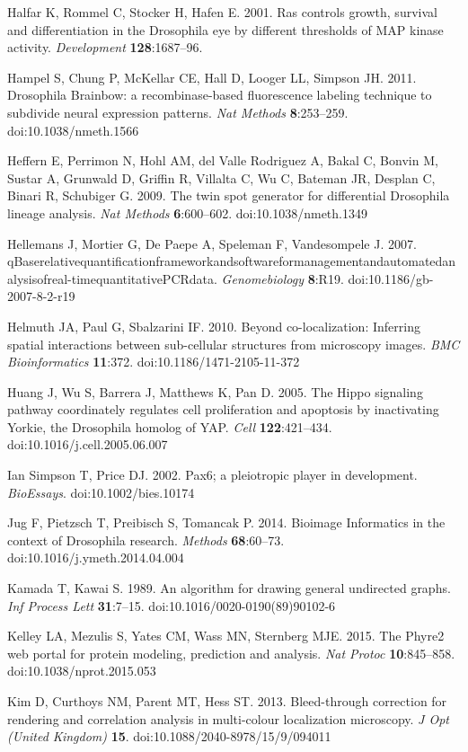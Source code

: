 Halfar K, Rommel C, Stocker H, Hafen E. 2001. Ras controls growth, survival and differentiation in the Drosophila eye by different thresholds of MAP kinase activity. \emph{Development} \textbf{128}:1687--96.

Hampel S, Chung P, McKellar CE, Hall D, Looger LL, Simpson JH. 2011. Drosophila Brainbow: a recombinase-based fluorescence labeling technique to subdivide neural expression patterns. \emph{Nat Methods} \textbf{8}:253--259. doi:10.1038/nmeth.1566

Heffern E, Perrimon N, Hohl AM, del Valle Rodriguez A, Bakal C, Bonvin M, Sustar A, Grunwald D, Griffin R, Villalta C, Wu C, Bateman JR, Desplan C, Binari R, Schubiger G. 2009. The twin spot generator for differential Drosophila lineage analysis. \emph{Nat Methods} \textbf{6}:600--602. doi:10.1038/nmeth.1349

Hellemans J, Mortier G, De Paepe A, Speleman F, Vandesompele J. 2007. qBaserelativequantificationframeworkandsoftwareformanagementandautomatedanalysisofreal-timequantitativePCRdata. \emph{Genomebiology} \textbf{8}:R19. doi:10.1186/gb-2007-8-2-r19

Helmuth JA, Paul G, Sbalzarini IF. 2010. Beyond co-localization: Inferring spatial interactions between sub-cellular structures from microscopy images. \emph{BMC Bioinformatics} \textbf{11}:372. doi:10.1186/1471-2105-11-372

Huang J, Wu S, Barrera J, Matthews K, Pan D. 2005. The Hippo signaling pathway coordinately regulates cell proliferation and apoptosis by inactivating Yorkie, the Drosophila homolog of YAP. \emph{Cell} \textbf{122}:421--434. doi:10.1016/j.cell.2005.06.007

Ian Simpson T, Price DJ. 2002. Pax6; a pleiotropic player in development. \emph{BioEssays}. doi:10.1002/bies.10174

Jug F, Pietzsch T, Preibisch S, Tomancak P. 2014. Bioimage Informatics in the context of Drosophila research. \emph{Methods} \textbf{68}:60--73. doi:10.1016/j.ymeth.2014.04.004

Kamada T, Kawai S. 1989. An algorithm for drawing general undirected graphs. \emph{Inf Process Lett} \textbf{31}:7--15. doi:10.1016/0020-0190(89)90102-6

Kelley LA, Mezulis S, Yates CM, Wass MN, Sternberg MJE. 2015. The Phyre2 web portal for protein modeling, prediction and analysis. \emph{Nat Protoc} \textbf{10}:845--858. doi:10.1038/nprot.2015.053

Kim D, Curthoys NM, Parent MT, Hess ST. 2013. Bleed-through correction for rendering and correlation analysis in multi-colour localization microscopy. \emph{J Opt (United Kingdom)} \textbf{15}. doi:10.1088/2040-8978/15/9/094011

